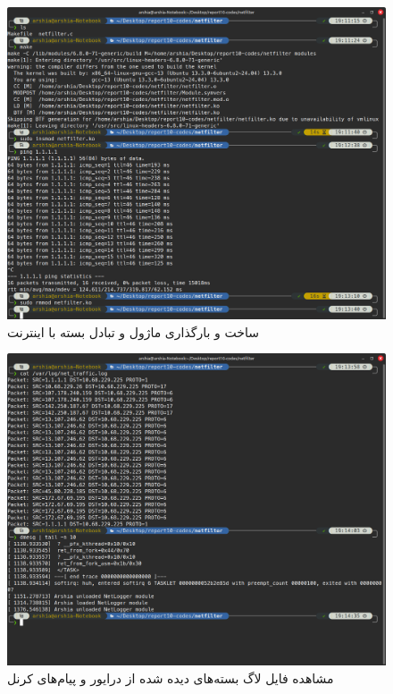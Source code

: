 \documentclass[12pt]{article}
\begin{document}
	\begin{figure}[H]
		\centering
		\includegraphics[width=\textwidth]{report10-resources/screenshots/6.png}
		\caption{ساخت و بارگذاری ماژول و تبادل بسته با اینترنت}
		\label{img:6}
	\end{figure}
	\begin{figure}[H]
		\centering
		\includegraphics[width=\textwidth]{report10-resources/screenshots/7.png}
		\caption{مشاهده فایل لاگ بسته‌های دیده شده از درایور و پیام‌های کرنل}
		\label{img:7}
	\end{figure}
        
	\newpage
	\begin{LTR}
		\printbibliography[title={مراجع}]
	\end{LTR}

	
\end{document}
